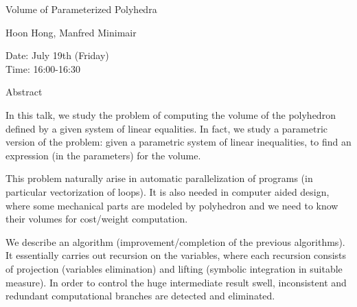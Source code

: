\begin{center}
\LARGE
Volume of Parameterized Polyhedra 

\end{center}

\begin{center}
\Large
Hoon Hong, Manfred Minimair

\end{center}

\noindent
Date:  July 19th (Friday)\\
Time:  16:00-16:30\\

\begin{center}
\large
Abstract
\end{center}

In this talk, we study the problem of computing the volume of the polyhedron defined by a given
system of linear equalities. In fact, we study a parametric version of the problem: given a
parametric system of linear inequalities, to find an expression (in the parameters) for the volume. 

This problem naturally arise in automatic parallelization of programs (in particular vectorization
of loops). It is also needed in computer aided design, where some mechanical parts are modeled by
polyhedron and we need to know their volumes for cost/weight computation. 

We describe an algorithm (improvement/completion of the previous algorithms). It essentially
carries out recursion on the variables, where each recursion consists of projection (variables
elimination) and lifting (symbolic integration in suitable measure). In order to control the huge
intermediate result swell, inconsistent and redundant computational branches are detected and
eliminated. 

